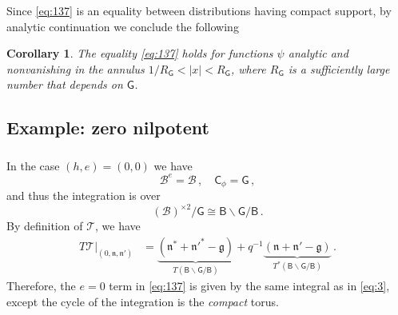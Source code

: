 \documentclass[14pt]{extarticle}
\newcommand{\bG}{\mathsf{G}}
\newcommand{\bC}{\mathsf{C}}
\newcommand{\bB}{\mathsf{B}}
\newcommand{\cT}{\mathscr{T}}
\newcommand{\cB}{\mathscr{B}}
\newcommand{\fg}{\mathfrak{g}}
\newcommand{\fn}{\mathfrak{n}}
\newcommand{\fb}{\mathfrak{b}}
\newtheorem{Corollary}[Lemma]{Corollary}
\theoremstyle{definition}
\begin{document}
\subsubsection{}

Since \eqref{eq:137} is an equality between distributions having
compact support, by analytic continuation we conclude the following

\begin{Corollary}\label{c_ac} 
The equality \eqref{eq:137} holds for functions $\psi$ analytic and
nonvanishing 
in the annulus $1/R_\bG < |x| < R_\bG$, where $R_\bG$ is a
sufficiently large number that depends on $\bG$. 
\end{Corollary}

\subsection{Example: zero nilpotent}

\subsubsection{}
In the case $(h,e) = (0,0)$ we have
\[
  \cB^e = \cB\,, \quad \bC_\phi = \bG \,, 
\]
and thus the integration is over 
\[
  (\cB)^{\times 2} /\bG 
\cong \bB \backslash \bG / \bB
\,.
\]
By definition of $\cT$, we have 
%
\begin{align}
  \label{eq:78}
  T \cT \big|_{(0, \fn, \fn')}
                               & = \underbrace{(\fn^* + \fn'^* - \fg)}_{T (\bB \backslash \bG / \bB)} + q^{-1}
\underbrace{(\fn+\fn' - \fg)}_{T^*(\bB \backslash \bG / \bB)} \,. 
\end{align}
%
Therefore, the $e=0$ term in \eqref{eq:137} is given by
the same integral as in \eqref{eq:3}, except the cycle of the
integration is the \emph{compact} torus.
\end{document}
